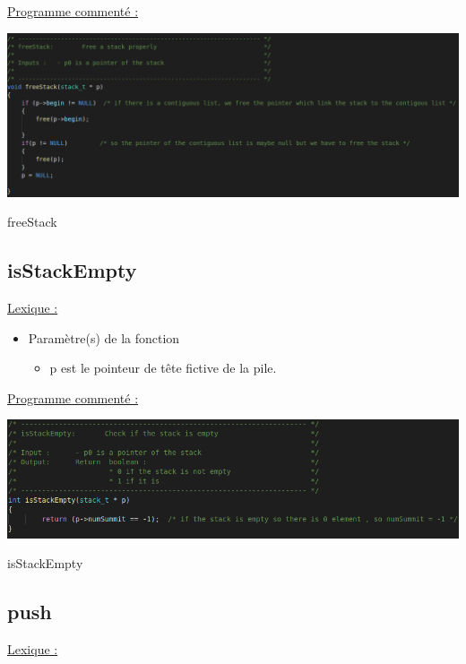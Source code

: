 \documentclass[a4paper]{article}
\begin{document}
\underline{Programme commenté :}
\begin{center}
\includegraphics[scale=0.4]{freeStack.png}

freeStack
\end{center}
\subsection{isStackEmpty}
\underline{Lexique :}

\begin{itemize}

\item Paramètre(s) de la fonction  

\begin{itemize}

\item p est le pointeur de tête fictive de la pile.

\end{itemize}

\end{itemize}

\underline{Programme commenté :}
\begin{center}
\includegraphics[scale=0.4]{isStackEmpty.png}

isStackEmpty\end{center}
\subsection{push}
\underline{Lexique :}
\end{document}
